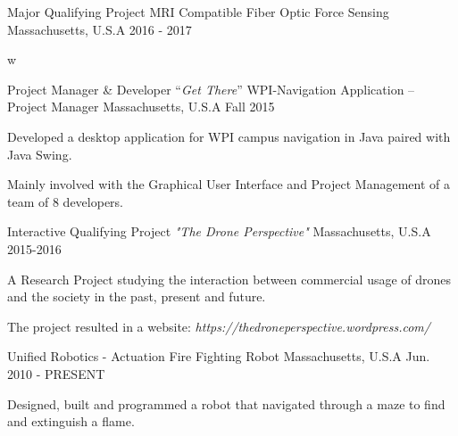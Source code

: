 \begin{cventries}
  \cventry
    {Major Qualifying Project}
    {MRI Compatible Fiber Optic Force Sensing}
    {Massachusetts, U.S.A}
    {2016 - 2017}
    {
      \begin{cvitems}
        \item {w}
      \end{cvitems}
    }
  \cventry
    {Project Manager \& Developer}
    {“\textit{Get There}” WPI-Navigation Application – Project Manager}
    {Massachusetts, U.S.A}
    {Fall 2015}
    {
      \begin{cvitems}
        \item {Developed a desktop application for WPI campus navigation in Java paired with Java Swing.}
        \item {Mainly involved with the Graphical User Interface and Project Management of a team of 8 developers.}
      \end{cvitems}
    }
    \cventry
    {Interactive Qualifying Project}
    {\textit{"The Drone Perspective"}}
    {Massachusetts, U.S.A}
    {2015-2016}
    {
      \begin{cvitems}
        \item {A Research Project studying the interaction between commercial usage of drones and the society in the past, present and future.}
        \item {The project resulted in a website: \textit{https://thedroneperspective.wordpress.com/}}
      \end{cvitems}
    }
    \cventry
    {Unified Robotics - Actuation}
    {Fire Fighting Robot}
    {Massachusetts, U.S.A}
    {Jun. 2010 - PRESENT}
    {
      \begin{cvitems}
        \item {Designed, built and programmed a robot that navigated through a maze to find and extinguish a flame.}
      \end{cvitems}
    }
    
\end{cventries}
